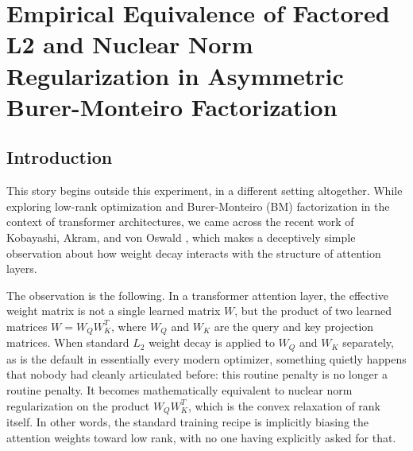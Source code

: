 
\section{Empirical Equivalence of Factored L2 and Nuclear Norm Regularization in Asymmetric Burer-Monteiro Factorization}

\subsection{Introduction}
This story begins outside this experiment, in a different setting altogether. While exploring low-rank optimization and Burer-Monteiro (BM) factorization in the context of transformer architectures, we came across the recent work of Kobayashi, Akram, and von Oswald \cite{kobayashi2024lowrank}, which makes a deceptively simple observation about how weight decay interacts with the structure of attention layers.

The observation is the following. In a transformer attention layer, the effective weight matrix is not a single learned matrix $W$, but the product of two learned matrices $W = W_Q W_K^T$, where $W_Q$ and $W_K$ are the query and key projection matrices. When standard $L_2$ weight decay is applied to $W_Q$ and $W_K$ separately, as is the default in essentially every modern optimizer, something quietly happens that nobody had cleanly articulated before: this routine penalty is no longer a routine penalty. It becomes mathematically equivalent to nuclear norm regularization on the product $W_Q W_K^T$, which is the convex relaxation of rank itself. In other words, the standard training recipe is implicitly biasing the attention weights toward low rank, with no one having explicitly asked for that.

